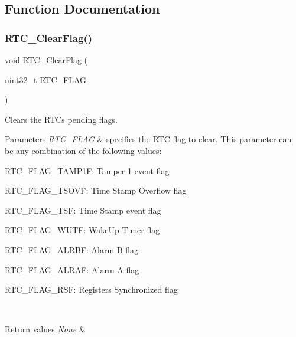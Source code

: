 \subsection{Function Documentation}
\mbox{\label{group__RTC__Group13_ga9be3325e05418d05c8c5a5ad369c7d50}} 
\subsubsection{R\+T\+C\+\_\+\+Clear\+Flag()}
{\footnotesize\ttfamily void R\+T\+C\+\_\+\+Clear\+Flag (\begin{DoxyParamCaption}\item[{uint32\+\_\+t}]{R\+T\+C\+\_\+\+F\+L\+AG }\end{DoxyParamCaption})}



Clears the R\+TC\textquotesingle{}s pending flags. 


\begin{DoxyParams}{Parameters}
{\em R\+T\+C\+\_\+\+F\+L\+AG} & specifies the R\+TC flag to clear. This parameter can be any combination of the following values\+: \begin{DoxyItemize}
\item R\+T\+C\+\_\+\+F\+L\+A\+G\+\_\+\+T\+A\+M\+P1F\+: Tamper 1 event flag \item R\+T\+C\+\_\+\+F\+L\+A\+G\+\_\+\+T\+S\+O\+VF\+: Time Stamp Overflow flag \item R\+T\+C\+\_\+\+F\+L\+A\+G\+\_\+\+T\+SF\+: Time Stamp event flag \item R\+T\+C\+\_\+\+F\+L\+A\+G\+\_\+\+W\+U\+TF\+: Wake\+Up Timer flag \item R\+T\+C\+\_\+\+F\+L\+A\+G\+\_\+\+A\+L\+R\+BF\+: Alarm B flag \item R\+T\+C\+\_\+\+F\+L\+A\+G\+\_\+\+A\+L\+R\+AF\+: Alarm A flag \item R\+T\+C\+\_\+\+F\+L\+A\+G\+\_\+\+R\+SF\+: Registers Synchronized flag \end{DoxyItemize}
\\
\hline
\end{DoxyParams}

\begin{DoxyRetVals}{Return values}
{\em None} & \\
\hline
\end{DoxyRetVals}


